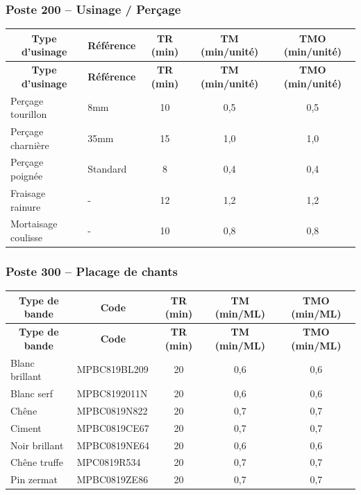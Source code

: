 \documentclass[12pt,a4paper]{article}
\begin{document}
\subsubsection{Poste 200 – Usinage / Perçage}

\begin{longtable}{|p{5cm}|p{5cm}|c|c|c|}
\hline
\multicolumn{1}{|c|}{\textbf{Type d'usinage}} & \multicolumn{1}{c|}{\textbf{Référence}} & \multicolumn{1}{c|}{\textbf{TR (min)}} & \multicolumn{1}{c|}{\textbf{TM (min/unité)}} & \multicolumn{1}{c|}{\textbf{TMO (min/unité)}} \\
\hline
\endfirsthead
\hline
\multicolumn{1}{|c|}{\textbf{Type d'usinage}} & \multicolumn{1}{c|}{\textbf{Référence}} & \multicolumn{1}{c|}{\textbf{TR (min)}} & \multicolumn{1}{c|}{\textbf{TM (min/unité)}} & \multicolumn{1}{c|}{\textbf{TMO (min/unité)}} \\
\hline
\endhead
\hline
\endfoot
Perçage tourillon & 8mm & 10 & 0,5 & 0,5 \\
Perçage charnière & 35mm & 15 & 1,0 & 1,0 \\
Perçage poignée & Standard & 8 & 0,4 & 0,4 \\
Fraisage rainure & - & 12 & 1,2 & 1,2 \\
Mortaisage coulisse & - & 10 & 0,8 & 0,8 \\
\hline
\end{longtable}

\subsubsection{Poste 300 – Placage de chants}

\begin{longtable}{|p{5cm}|p{5cm}|c|c|c|}
\hline
\multicolumn{1}{|c|}{\textbf{Type de bande}} & \multicolumn{1}{c|}{\textbf{Code}} & \multicolumn{1}{c|}{\textbf{TR (min)}} & \multicolumn{1}{c|}{\textbf{TM (min/ML)}} & \multicolumn{1}{c|}{\textbf{TMO (min/ML)}} \\
\hline
\endfirsthead
\hline
\multicolumn{1}{|c|}{\textbf{Type de bande}} & \multicolumn{1}{c|}{\textbf{Code}} & \multicolumn{1}{c|}{\textbf{TR (min)}} & \multicolumn{1}{c|}{\textbf{TM (min/ML)}} & \multicolumn{1}{c|}{\textbf{TMO (min/ML)}} \\
\hline
\endhead
\hline
\endfoot
Blanc brillant & MPBC819BL209 & 20 & 0,6 & 0,6 \\
Blanc serf & MPBC8192011N & 20 & 0,6 & 0,6 \\
Chêne & MPBC0819N822 & 20 & 0,7 & 0,7 \\
Ciment & MPBC0819CE67 & 20 & 0,7 & 0,7 \\
Noir brillant & MPBC0819NE64 & 20 & 0,6 & 0,6 \\
Chêne truffe & MPC0819R534 & 20 & 0,7 & 0,7 \\
Pin zermat & MPBC0819ZE86 & 20 & 0,7 & 0,7 \\
\hline
\end{longtable}
\end{document}
